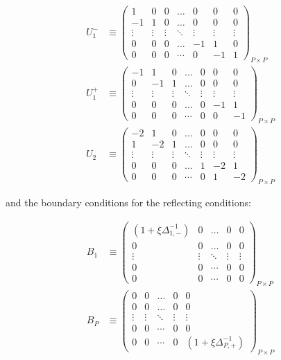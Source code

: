 \documentclass[11pt]{article}
\begin{document}
\begin{align}
U_1^{-} &\equiv \begin{pmatrix}
1  &0&0&\dots&0&0&0\\
-1&1&0&\dots&0&0&0\\
\vdots&\vdots&\vdots&\ddots&\vdots&\vdots&\vdots\\
0&0&0&\dots&-1&1&0\\
0&0&0&\cdots&0&-1&1
\end{pmatrix}_{P\times P}\label{eq:L-1-basis} \\
U_1^{+} &\equiv \begin{pmatrix}
-1  &1&0&\dots&0&0&0\\
0&-1&1&\dots&0&0&0\\
\vdots&\vdots&\vdots&\ddots&\vdots&\vdots&\vdots\\
0&0&0&\dots&0&-1&1\\
0&0&0&\cdots&0&0&-1
\end{pmatrix}_{P\times P}\label{eq:L-1+-basis} \\
U_2 &\equiv \begin{pmatrix}
-2 &1&0&\dots&0&0&0\\
1&-2&1&\dots&0&0&0\\
\vdots&\vdots&\vdots&\ddots&\vdots&\vdots&\vdots\\
0&0&0&\dots&1&-2&1\\
0&0&0&\cdots&0&1&-2 
\end{pmatrix}_{P\times P}\label{eq:L-2-basis}
\end{align}

and the boundary conditions for the reflecting conditions:

\begin{align}
B_{1}  &\equiv \begin{pmatrix}
(1 + \xi \Delta^{-1}_{1,-}) &0&\dots&0&0\\
0&0&\dots&0&0\\
\vdots&\vdots&\ddots&\vdots&\vdots\\
0&0&\cdots&0&0\\
0&0&\cdots&0&0
\end{pmatrix}_{P\times P} \\
B_{P}  &\equiv \begin{pmatrix}
0 &0&\dots&0&0\\
0&0&\dots&0&0\\
\vdots&\vdots&\ddots&\vdots&\vdots\\
0&0&\cdots&0&0\\
0&0&\cdots&0&(1 + \xi \Delta^{-1}_{P,+})
\end{pmatrix}_{P\times P}
\end{align}
\end{document}
